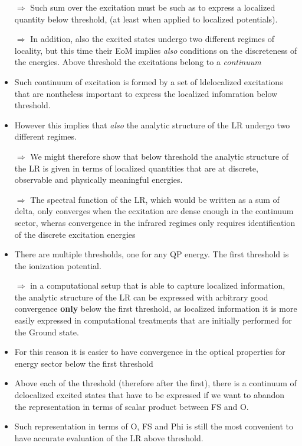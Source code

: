\documentclass[a4paper]{article}
\begin{document}
\begin{itemize}
\item [$\Rightarrow$]Such sum over the excitation must be such as to express a localized quantity below threshold, (at least when applied to localized potentials).
\item[$\Rightarrow$] In addition, also the excited states undergo two different regimes of locality, but this time their EoM implies \emph{also} conditions on the discreteness of the energies. Above threshold the excitations belong to a \emph{continuum}
\item Such continuum of excitation is formed by a set of ldelocalized excitations that are nontheless important to express the localized infomration below threshold.
\item However this implies that \emph{also} the analytic structure of the LR undergo two different regimes.
\item[$\Rightarrow$] We might therefore show that below threshold the analytic structure of the LR is given in terms of localized quantities that are at discrete, observable and physically meaningful energies.
\item[$\Rightarrow$] The spectral function of the LR, which would be written as a sum of delta, only converges when the ecxitation are dense enough in the continuum sector, wheras convergence in the infrared regimes only requires identification of the discrete excitation energies
\item There are multiple thresholds, one for any QP energy. The first threshold is the ionization potential.
\item[$\Rightarrow$] in a computational setup that is able to capture localized information, the analytic structure of the LR can be expressed with arbitrary good convergence \textbf{only} below the first threshold, as localized information it is more easily expressed in computational treatments that are initially performed for the Ground state.
\item For this reason it is easier to have convergence in the optical properties for energy sector below the first threshold
\item Above each of the threshold (therefore after the first), there is a continuum of delocalized excited states that have to be expressed if we want to abandon the representation in terms of scalar product between FS and O.
\item Such representation in terms of O, FS and Phi is still the most convenient to have accurate evaluation of the LR above threshold.

\end{itemize}
\end{document}
